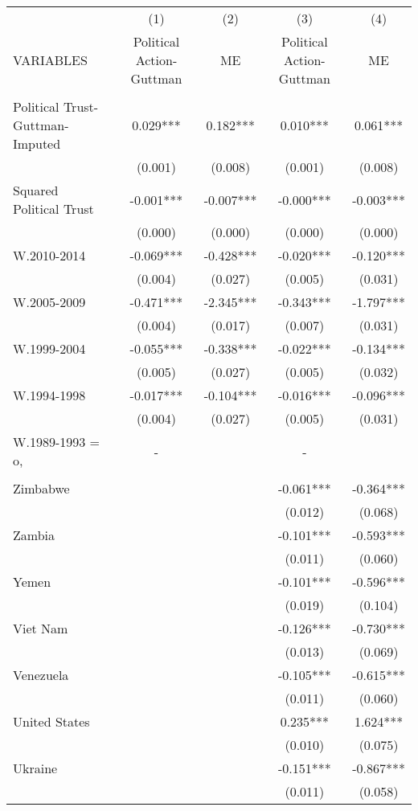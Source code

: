 \documentclass[]{article}
\begin{document}
\begin{tabular}{lcccc} \hline
 & (1) & (2) & (3) & (4) \\
VARIABLES & Political Action-Guttman & ME & Political Action-Guttman & ME \\ \hline
 &  &  &  &  \\
Political Trust-Guttman-Imputed & 0.029*** & 0.182*** & 0.010*** & 0.061*** \\
 & (0.001) & (0.008) & (0.001) & (0.008) \\
Squared Political Trust & -0.001*** & -0.007*** & -0.000*** & -0.003*** \\
 & (0.000) & (0.000) & (0.000) & (0.000) \\
W.2010-2014 & -0.069*** & -0.428*** & -0.020*** & -0.120*** \\
 & (0.004) & (0.027) & (0.005) & (0.031) \\
W.2005-2009 & -0.471*** & -2.345*** & -0.343*** & -1.797*** \\
 & (0.004) & (0.017) & (0.007) & (0.031) \\
W.1999-2004 & -0.055*** & -0.338*** & -0.022*** & -0.134*** \\
 & (0.005) & (0.027) & (0.005) & (0.032) \\
W.1994-1998 & -0.017*** & -0.104*** & -0.016*** & -0.096*** \\
 & (0.004) & (0.027) & (0.005) & (0.031) \\
W.1989-1993 = o, & - &  & - &  \\
 &  &  &  &  \\
Zimbabwe &  &  & -0.061*** & -0.364*** \\
 &  &  & (0.012) & (0.068) \\
Zambia &  &  & -0.101*** & -0.593*** \\
 &  &  & (0.011) & (0.060) \\
Yemen &  &  & -0.101*** & -0.596*** \\
 &  &  & (0.019) & (0.104) \\
Viet Nam &  &  & -0.126*** & -0.730*** \\
 &  &  & (0.013) & (0.069) \\
Venezuela &  &  & -0.105*** & -0.615*** \\
 &  &  & (0.011) & (0.060) \\
United States &  &  & 0.235*** & 1.624*** \\
 &  &  & (0.010) & (0.075) \\
Ukraine &  &  & -0.151*** & -0.867*** \\
 &  &  & (0.011) & (0.058) \\

\end{tabular}
\end{document}
